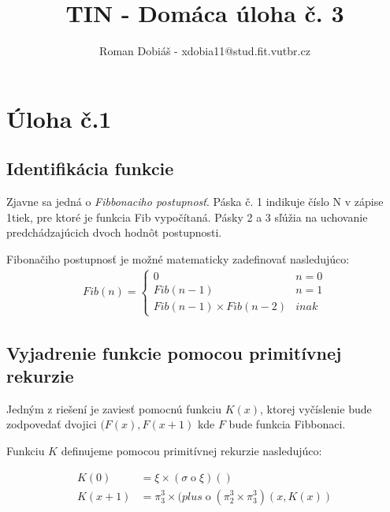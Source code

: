 \documentclass[10pt]{article}
\begin{document}
 
 
 
\title{TIN - Domáca úloha č. 3}%
\author{Roman Dobiáš - xdobia11@stud.fit.vutbr.cz}
 
\maketitle

\section*{Úloha č.1}
\subsection*{Identifikácia funkcie}
Zjavne sa jedná o \textit{Fibbonaciho postupnosť}. Páska č. 1 indikuje číslo N v zápise 1tiek, pre ktoré je funkcia Fib vypočítaná. Pásky 2 a 3 sľúžia na uchovanie predchádzajúcich dvoch
hodnôt postupnosti. 

Fibonačiho postupnosť je možné matematicky zadefinovať nasledujúco:
\begin{align}
    Fib(n) = 
    \begin{cases}
        0 & n = 0\\
        Fib(n-1) & n = 1\\
        Fib(n-1)\times Fib(n-2) & inak
    \end{cases}
\end{align}
\subsection*{Vyjadrenie funkcie pomocou primitívnej rekurzie}

Jedným z riešení je zaviesť pomocnú funkciu $K(x)$, ktorej vyčíslenie bude zodpovedať dvojici $(F(x), F(x+1)$ kde $F$ bude funkcia Fibbonaci.

Funkciu $K$ definujeme pomocou primitívnej rekurzie nasledujúco:

\begin{align*}
    K(0) &= \xi \times ( \sigma  \mathbin{o} \xi ) () \\
    K(x+1) &= \pi_3^3 \times (plus  \mathbin{o} ( \pi_2^3 \times \pi_3^3)  (x, K(x))
\end{align*}
\end{document}
